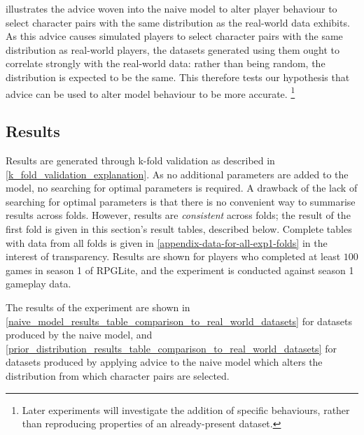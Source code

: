  illustrates the advice woven into the
naive model to alter player behaviour to select character pairs with the same
distribution as the real-world data exhibits. As this advice causes simulated
players to select character pairs with the same distribution as real-world
players, the datasets generated using them ought to correlate strongly with the
real-world data: rather than being random, the distribution is expected to be
the same. This therefore tests our hypothesis that advice can be used to alter
model behaviour to be more accurate.
\footnote{
  Later experiments will investigate the addition of specific behaviours, rather
  than reproducing properties of an already-present dataset.
}


\subsection{Results}

Results are generated through k-fold validation as described in
\cref{k_fold_validation_explanation}. As no additional parameters are added to
the model, no searching for optimal parameters is required. A drawback of the
lack of searching for optimal parameters is that there is no convenient way to
summarise results across folds. However, results are \emph{consistent} across
folds; the result of the first fold is given in this section's result tables,
described below. Complete tables with data from all folds is given in
\cref{appendix-data-for-all-exp1-folds} in the interest of transparency. Results
are shown for players who completed at least $100$ games in season 1 of RPGLite,
and the experiment is conducted against season 1 gameplay data.

The results of the experiment are shown in
\cref{naive_model_results_table_comparison_to_real_world_datasets} for datasets
produced by the naive model, and
\cref{prior_distribution_results_table_comparison_to_real_world_datasets} for
datasets produced by applying advice to the naive model which alters the
distribution from which character pairs are selected.

